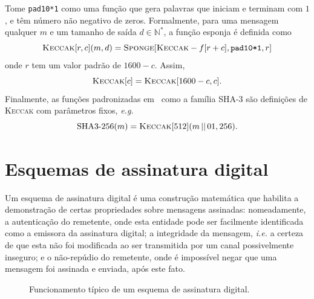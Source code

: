 \documentclass{ufsctex/ufsctex}
\newcommand{\pk}{\mathcal{P}_{k}}
\newcommand{\sk}{\mathcal{S}_{k}}
\newcommand{\concat}{\, \vert{} \vert{} \,}
\newcommand{\binwds}[1]{\{0, 1\}^{#1}}
\begin{document}
Tome \texttt{pad10*1} como uma função que gera palavras que iniciam e terminam
com $1$, e têm número não negativo de zeros. Formalmente, para uma mensagem
qualquer $m$ e um tamanho de saída $d \in \mathbb{N}^{*}$, a função esponja é
definida como
\begin{equation}
  \textsc{Keccak}[r, c](m, d)
    = \textsc{Sponge}[\textsc{Keccak}-f[r + c], \texttt{pad10*1}, r]
\end{equation}
onde $r$ tem um valor padrão de $1600 - c$. Assim,
\begin{equation}
  \textsc{Keccak}[c] = \textsc{Keccak}[1600 - c, c].
\end{equation}
Finalmente, as funções padronizadas em~\cite{Dworkin:report:2015:jul} como a
família SHA-3 são definições de \textsc{Keccak} com parâmetros fixos,
\emph{e.g.}
\begin{equation}
  \text{SHA3-}256(m) = \textsc{Keccak}[512](m \concat 01, 256).
\end{equation}\simbolo{$\concat$}{Concatenação de palavras}

\section{Esquemas de assinatura digital}\label{section:digitalsig}

Um esquema de assinatura digital é uma construção matemática que habilita a
demonstração de certas propriedades sobre mensagens assinadas: nomeadamente, a
autenticação do remetente, onde esta entidade pode ser facilmente identificada
como a emissora da assinatura digital; a integridade da mensagem, \emph{i.e.} a
certeza de que esta não foi modificada ao ser transmitida por um canal
possivelmente inseguro; e o não-repúdio do remetente, onde é impossível negar
que uma mensagem foi assinada e enviada, após este fato.

\begin{figure}
  \centering
  \caption{Funcionamento típico de um
    esquema de assinatura digital.}\label{fig:2}
\end{figure}
\end{document}
